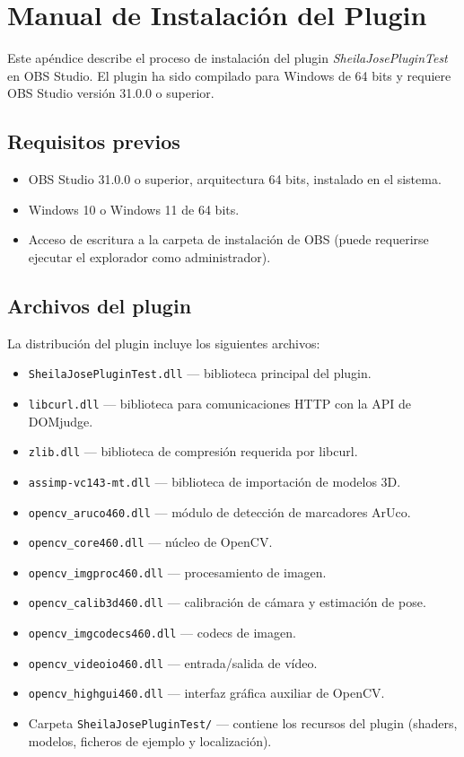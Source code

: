 \chapter{Manual de Instalación del Plugin}
\label{Appendix:Instalacion}

Este apéndice describe el proceso de instalación del plugin \textit{SheilaJosePluginTest} en OBS Studio. El plugin ha sido compilado para Windows de 64 bits y requiere OBS Studio versión 31.0.0 o superior.

\section*{Requisitos previos}

\begin{itemize}
  \item OBS Studio 31.0.0 o superior, arquitectura 64 bits, instalado en el sistema.
  \item Windows 10 o Windows 11 de 64 bits.
  \item Acceso de escritura a la carpeta de instalación de OBS (puede requerirse ejecutar el explorador como administrador).
\end{itemize}

\section*{Archivos del plugin}

La distribución del plugin incluye los siguientes archivos:

\begin{itemize}
  \item \texttt{SheilaJosePluginTest.dll} — biblioteca principal del plugin.
  \item \texttt{libcurl.dll} — biblioteca para comunicaciones HTTP con la API de DOMjudge.
  \item \texttt{zlib.dll} — biblioteca de compresión requerida por libcurl.
  \item \texttt{assimp-vc143-mt.dll} — biblioteca de importación de modelos 3D.
  \item \texttt{opencv\_aruco460.dll} — módulo de detección de marcadores ArUco.
  \item \texttt{opencv\_core460.dll} — núcleo de OpenCV.
  \item \texttt{opencv\_imgproc460.dll} — procesamiento de imagen.
  \item \texttt{opencv\_calib3d460.dll} — calibración de cámara y estimación de pose.
  \item \texttt{opencv\_imgcodecs460.dll} — codecs de imagen.
  \item \texttt{opencv\_videoio460.dll} — entrada/salida de vídeo.
  \item \texttt{opencv\_highgui460.dll} — interfaz gráfica auxiliar de OpenCV.
  \item Carpeta \texttt{SheilaJosePluginTest/} — contiene los recursos del plugin (shaders, modelos, ficheros de ejemplo y localización).
\end{itemize}


